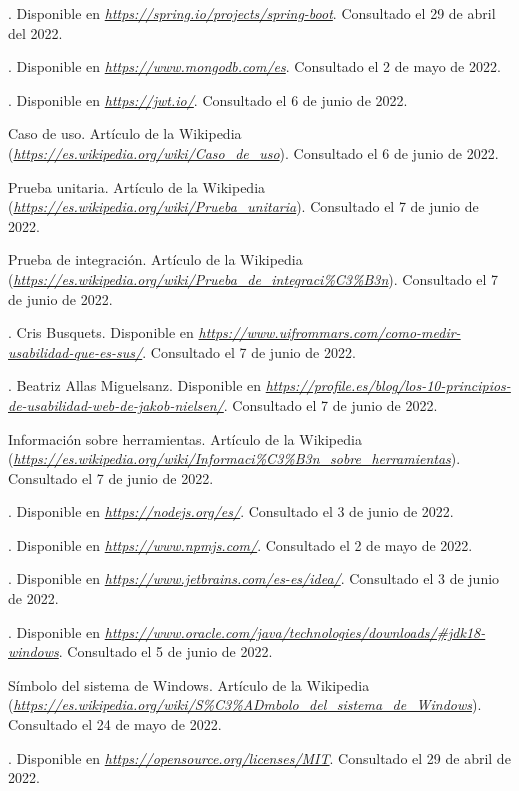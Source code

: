 \begin{thebibliography}{99}
. Disponible en {\it \url{https://spring.io/projects/spring-boot}}. Consultado el 29 de abril del 2022.

. Disponible en {\it \url{https://www.mongodb.com/es}}. Consultado el 2 de mayo de 2022.

. Disponible en {\it \url{https://jwt.io/}}. Consultado el 6 de junio de 2022.

 Caso de uso. Artículo de la Wikipedia ({\it \url{https://es.wikipedia.org/wiki/Caso_de_uso}}). Consultado el 6 de junio de 2022.

 Prueba unitaria. Artículo de la Wikipedia ({\it \url{https://es.wikipedia.org/wiki/Prueba_unitaria}}). Consultado el 7 de junio de 2022.

 Prueba de integración. Artículo de la Wikipedia ({\it \url{https://es.wikipedia.org/wiki/Prueba_de_integraci%C3%B3n}}). Consultado el 7 de junio de 2022.

. Cris Busquets. Disponible en {\it \url{https://www.uifrommars.com/como-medir-usabilidad-que-es-sus/}}. Consultado el 7 de junio de 2022.

. Beatriz Allas Miguelsanz. Disponible en {\it \url{https://profile.es/blog/los-10-principios-de-usabilidad-web-de-jakob-nielsen/}}. Consultado el 7 de junio de 2022.

 Información sobre herramientas. Artículo de la Wikipedia ({\it \url{https://es.wikipedia.org/wiki/Informaci%C3%B3n_sobre_herramientas}}). Consultado el 7 de junio de 2022.

. Disponible en {\it \url{https://nodejs.org/es/}}. Consultado el 3 de junio de 2022.

. Disponible en {\it \url{https://www.npmjs.com/}}. Consultado el 2 de mayo de 2022.

. Disponible en {\it \url{https://www.jetbrains.com/es-es/idea/}}. Consultado el 3 de junio de 2022.

. Disponible en {\it \url{https://www.oracle.com/java/technologies/downloads/#jdk18-windows}}. Consultado el 5 de junio de 2022.

 Símbolo del sistema de Windows. Artículo de la Wikipedia ({\it \url{https://es.wikipedia.org/wiki/S%C3%ADmbolo_del_sistema_de_Windows}}). Consultado el 24 de mayo de 2022.

. Disponible en {\it \url{https://opensource.org/licenses/MIT}}. Consultado el 29 de abril de 2022.
\end{thebibliography}